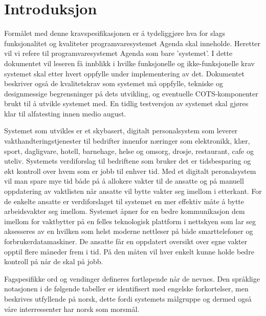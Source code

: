 \chapter{Introduksjon}
\setlength{\parindent}{2ex}
Formålet med denne kravspesifikasjonen er å tydeliggjøre hva for slags funksjonalitet og kvaliteter programvaresystemet Agenda skal inneholde. Heretter vil vi refere til programvaresystemet Agenda som bare 'systemet'. I dette dokumentet vil leseren få innblikk i hvilke funksjonelle og ikke-funksjonelle krav systemet skal etter hvert oppfylle under implementering av det. Dokumentet beskriver også de kvalitetskrav som systemet må oppfylle, tekniske og designmessige begrensninger på dets utvikling, og eventuelle COTS-komponenter brukt til å utvikle systemet med. En tidlig testversjon av systemet skal gjøres klar til alfatesting innen medio august.\par
Systemet som utvikles er et skybasert, digitalt personalsystem som leverer vakthandteringstjenester til bedrifter innenfor næringer som elektronikk, klær, sport, dagligvare, hotell, barnehage, helse og omsorg, drosje, restaurant, cafe og uteliv. Systemets verdiforslag til bedriftene som bruker det er tidsbesparing og økt kontroll over hvem som er jobb til enhver tid. Med et digitalt peronalsystem vil man spare mye tid både på å allokere vakter til de ansatte og på manuell oppdatering av vaktlisten når ansatte vil bytte vakter seg imellom i etterkant. For de enkelte ansatte er verdiforslaget til systemet en mer effektiv måte å bytte arbeidsvakter seg imellom. Systemet åpner for en bedre kommunikasjon dem imellom for vaktbytter på en felles teknologisk plattform i nettskyen som lar seg aksesseres av en hvilken som helst moderne nettleser på både smarttelefoner og forbrukerdatamaskiner. De ansatte får en oppdatert oversikt over egne vakter opptil flere måneder frem i tid. På den måten vil hver enkelt kunne holde bedre kontroll på når de skal på jobb.\par
Fagspesifikke ord og vendinger defineres fortløpende når de nevnes. Den språklige notasjonen i de følgende tabeller er identifisert med engelske forkortelser, men beskrives utfyllende på norsk, dette fordi systemets målgruppe og dermed også våre interressenter har norsk som morsmål.